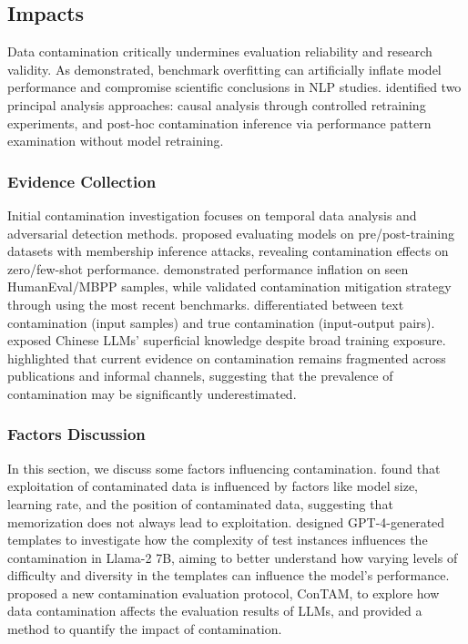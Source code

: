 \subsection{Impacts}

Data contamination critically undermines evaluation reliability and research validity. As \cite{sainz-etal-2023-nlp} demonstrated, benchmark overfitting can artificially inflate model performance and compromise scientific conclusions in NLP studies. \cite{singh2024evaluation} identified two principal analysis approaches: causal analysis through controlled retraining experiments, and post-hoc contamination inference via performance pattern examination without model retraining.

\subsubsection{Evidence Collection}
\label{subsubsec:evidence}
Initial contamination investigation focuses on temporal data analysis and adversarial detection methods. \citet{li2024task} proposed evaluating models on pre/post-training datasets with membership inference attacks, revealing contamination effects on zero/few-shot performance. \citet{riddell2024quantifyingcontaminationevaluatingcode} demonstrated performance inflation on seen HumanEval/MBPP samples, while \citet{cao2024concerneddatacontaminationassessing} validated contamination mitigation strategy through using the most recent benchmarks. \citet{jiang2024investigatingdatacontaminationpretraining} differentiated between text contamination (input samples) and true contamination (input-output pairs). \citet{liu-etal-2024-evaluating} exposed Chinese LLMs' superficial knowledge despite broad training exposure. \citet{sainz-etal-2023-nlp} highlighted that current evidence on contamination remains fragmented across publications and informal channels, suggesting that the prevalence of contamination may be significantly underestimated.


\subsubsection{Factors Discussion}
In this section, we discuss some factors influencing contamination. \citet{magar-schwartz-2022-data} found that exploitation of contaminated data is influenced by factors like model size, learning rate, and the position of contaminated data, suggesting that memorization does not always lead to exploitation. \citet{mehrbakhsh-etal-2024-confounders} designed GPT-4-generated templates to investigate how the complexity of test instances influences the contamination in Llama-2 7B, aiming to better understand how varying levels of difficulty and diversity in the templates can influence the model's performance.
\citet{singh2024evaluation} proposed a new contamination evaluation protocol, ConTAM, to explore how data contamination affects the evaluation results of LLMs, and provided a method to quantify the impact of contamination.

